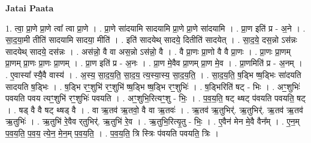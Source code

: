 \documentclass[17pt]{extarticle}
\begin{document}
\textbf{Jatai Paata} \newline

1. त्वा॒ प्रा॒णे प्रा॒णे त्वा᳚ त्वा प्रा॒णे । . प्रा॒णे सा॑दयामि सादयामि प्रा॒णे प्रा॒णे सा॑दयामि । . प्रा॒ण इति॑ प्र - अ॒ने । . सा॒द॒या॒मी तीति॑ सादयामि सादया॒ मीति॑ । . इति॑ सादयेथ् सादये॒ दितीति॑ सादयेत् । . सा॒द॒ये॒ दस॒न्नो ऽस॑न्नः सादयेथ् सादये॒ दस॑न्नः । . अस॑न्नो॒ वै वा अस॒न्नो ऽस॑न्नो॒ वै । . वै प्रा॒णः प्रा॒णो वै वै प्रा॒णः । . प्रा॒णः प्रा॒णम् प्रा॒णम् प्रा॒णः प्रा॒णः प्रा॒णम् । . प्रा॒ण इति॑ प्र - अ॒नः । . प्रा॒ण मे॒वैव प्रा॒णम् प्रा॒ण मे॒व । . प्रा॒णमिति॑ प्र - अ॒नम् । . ए॒वास्या᳚ स्यै॒वै वास्य॑ । . अ॒स्य॒ सा॒द॒य॒ति॒ सा॒द॒य॒ त्य॒स्या॒स्य॒ सा॒द॒य॒ति॒ । . सा॒द॒य॒ति॒ ष॒ड्भि ष्ष॒ड्भिः सा॑दयति सादयति ष॒ड्भिः । . ष॒ड्भि रꣳ॒॒शुभि॑ रꣳ॒॒शुभि॑ ष्ष॒ड्भि ष्ष॒ड्भि रꣳ॒॒शुभिः॑ । . ष॒ड्भिरिति॑ षट् - भिः । . अꣳ॒॒शुभिः॑ पवयति पवय त्यꣳ॒॒शुभि॑ रꣳ॒॒शुभिः॑ पवयति । . अꣳ॒॒शुभि॒रित्यꣳ॒॒शु - भिः॒ । . प॒व॒य॒ति॒ षट् थ्षट् प॑वयति पवयति॒ षट् । . षड् वै वै षट् थ्षड् वै । . वा ऋ॒तव॑ ऋ॒तवो॒ वै वा ऋ॒तवः॑ । . ऋ॒तव॑ ऋ॒तुभिर्॑. ऋ॒तुभिर्॑. ऋ॒तव॑ ऋ॒तव॑ ऋ॒तुभिः॑ । . ऋ॒तुभि॑ रे॒वैव र्‌तुभिर्॑. ऋ॒तुभि॑ रे॒व । . ऋ॒तुभि॒रित्यृ॒तु - भिः॒ । . ए॒वैन॑ मेन मे॒वै वैन᳚म् । . ए॒न॒म् प॒व॒य॒ति॒ प॒व॒य॒ त्ये॒न॒ मे॒न॒म् प॒व॒य॒ति॒ । . प॒व॒य॒ति॒ त्रि स्त्रिः प॑वयति पवयति॒ त्रिः । \newline
\end{document}

